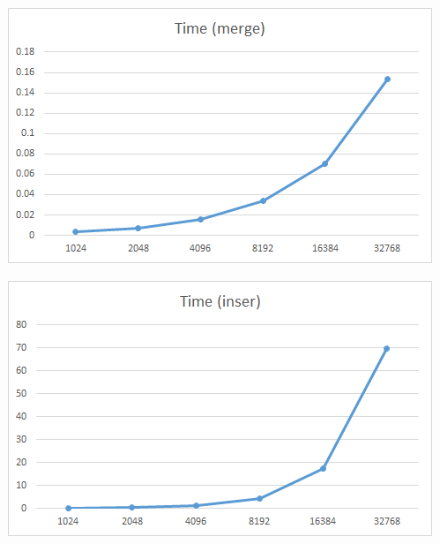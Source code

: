 \documentclass[conference]{IEEEtran}
\begin{document}
\begin{table}
    \caption{Kendall Tau Distance}
    \begin{center}
    \end{center}
\end{table}


\begin{figure}[H]
    \centerline{\includegraphics[scale=0.65]{Pic/pic6.png}}
\end{figure}

\begin{figure}[H]
    \centerline{\includegraphics[scale=0.65]{Pic/pic7.png}}
\end{figure}
\end{document}
